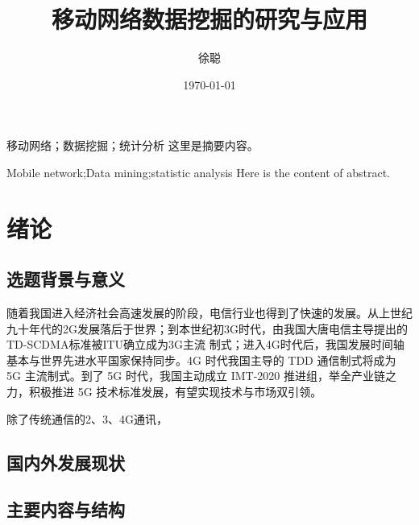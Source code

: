 \documentclass{HustGraduPaper}
\title{移动网络数据挖掘的研究与应用}
\author{徐聪}
\date{\today}
\begin{document}
    \maketitle
    \statement
    \clearpage

    \begin{cnabstract}{移动网络；数据挖掘；统计分析}
        这里是摘要内容。
    \end{cnabstract}
    \begin{enabstract}{Mobile network;Data mining;statistic analysis}
        Here is the content of abstract.
    \end{enabstract}

    \tableofcontents
    \clearpage

    \section{绪论}
    
    \subsection{选题背景与意义}
    随着我国进入经济社会高速发展的阶段，电信行业也得到了快速的发展。从上世纪九十年代的2G发展落后于世界；到本世纪初3G时代，由我国大唐电信主导提出的TD-SCDMA标准被ITU确立成为3G主流
    制式；进入4G时代后，我国发展时间轴基本与世界先进水平国家保持同步。4G 时代我国主导的 TDD 通信制式将成为 5G 主流制式。到了 5G
    时代，我国主动成立 IMT-2020 推进组，举全产业链之力，积极推进 5G 技术标准发展，有望实现技术与市场双引领。
    
    除了传统通信的2、3、4G通讯，  
    
    \subsection{国内外发展现状}
    \subsection{主要内容与结构}
    
    
\end{document}
